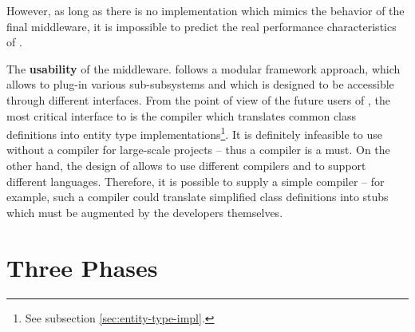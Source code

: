 \documentclass[a4paper, 10pt]{book}
\begin{document}
\begin{description}
                                                However, as long as there is no implementation which mimics the
                                                behavior of the final middleware, it is impossible to predict the
                                                real performance characteristics of \SYNEIGHT.
                                            \item The \textbf{usability} of the middleware. \SYNEIGHT follows a
                                                modular framework approach, which allows to plug-in various
                                                sub-subsystems and which is designed to be accessible through
                                                different interfaces. From the point of view of the future users of
                                                \SYNEIGHT, the most critical interface to \SYNEIGHT is the compiler which
                                                translates common class definitions into entity type
                                                implementations\footnote{See subsection
                                                \vref{sec:entity-type-impl}.}. It is definitely infeasible to use
                                                \SYNEIGHT without a compiler for large-scale projects -- thus a compiler
                                                is a must. On the other hand, the design of \SYNEIGHT allows to use
                                                different compilers and to support different languages. Therefore,
                                                it is possible to supply a simple compiler -- for example, such a
                                                compiler could translate simplified class definitions into stubs
                                                which must be augmented by the developers themselves. 
                                        \end{description}



                                        \section{Three Phases}
\end{document}
